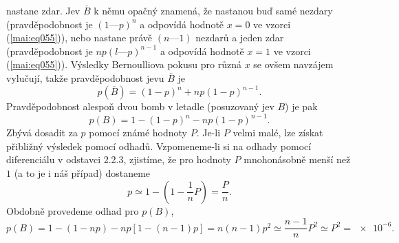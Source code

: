 \begin{example}
  nastane zdar. Jev \(\overline{B}\) k němu opačný znamená, že nastanou buď samé nezdary 
  (pravděpodobnost je \((1 — p)^n\) a odpovídá hodnotě \(x = 0\) ve vzorci (\ref{mai:eq055})), nebo 
  nastane právě \((n — 1)\) nezdarů a jeden zdar (pravděpodobnost je \(np(l — p)^{n-1}\) a odpovídá 
  hodnotě \(x = 1\) ve vzorci (\ref{mai:eq055})). Výsledky Bernoulliova pokusu pro různá \(x\) se 
  ovšem navzájem vylučují, takže pravděpodobnost jevu \(\overline{B}\) je
  \begin{equation*}
    p(\overline{B}) = (1 - p)^n + np(1 - p)^{n-1}.
  \end{equation*}
  Pravděpodobnost alespoň dvou bomb v letadle (posuzovaný jev \(B\)) je pak
  \begin{equation*}
    p(B) = 1 - (1 - p)^n - np(1 - p)^{n-1}.
  \end{equation*}
  Zbývá dosadit za \(p\) pomocí známé hodnoty \(P\). Je-li \(P\) velmi malé, lze získat přibližný 
  výsledek pomocí odhadů. Vzpomeneme-li si na odhady pomocí diferenciálu v odstavci 2.2.3, 
  zjistíme, že pro hodnoty \(P\) mnohonásobně menší než \(1\) (a to je i náš případ) dostaneme
  \begin{equation*}
    p \simeq 1 - \left(1 - \dfrac{1}{n}P\right) = \dfrac{P}{n}.
  \end{equation*}
  Obdobně provedeme odhad pro \(p(B)\),
  \begin{equation*}
    p(B) = 1 - (1 - np) - np\left[1 - (n - 1)p\right] = n(n - 1)p^2 \simeq \dfrac{n-1}{n}P^2 
         \simeq P^2 = \num{e-6}.
  \end{equation*}
\normalsize
\end{example}
